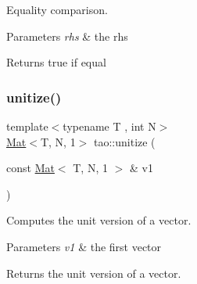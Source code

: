Equality comparison. 


\begin{DoxyParams}{Parameters}
{\em rhs} & the rhs \\
\hline
\end{DoxyParams}
\begin{DoxyReturn}{Returns}
true if equal 
\end{DoxyReturn}
\mbox{\label{namespacetao_a413b369fdee9e7ff22a073ef73d2e302}} 
\subsubsection{\texorpdfstring{unitize()}{unitize()}}
{\footnotesize\ttfamily template$<$typename T , int N$>$ \\
\mbox{\hyperlink{classtao_1_1_mat}{Mat}}$<$T, N, 1$>$ tao\+::unitize (\begin{DoxyParamCaption}\item[{const \mbox{\hyperlink{classtao_1_1_mat}{Mat}}$<$ T, N, 1 $>$ \&}]{v1 }\end{DoxyParamCaption})}



Computes the unit version of a vector. 


\begin{DoxyParams}{Parameters}
{\em v1} & the first vector \\
\hline
\end{DoxyParams}
\begin{DoxyReturn}{Returns}
the unit version of a vector. 
\end{DoxyReturn}
